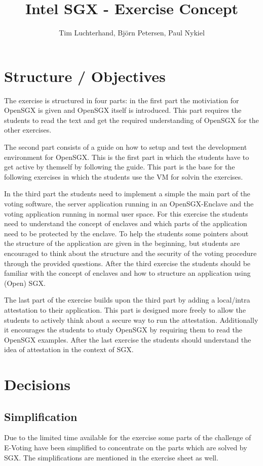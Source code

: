 \documentclass[DIN, pagenumber=false, fontsize=11pt, parskip=half]{scrartcl}
\title{Intel SGX - Exercise Concept}
\author{Tim Luchterhand, Björn Petersen, Paul Nykiel}
\begin{document}
    \maketitle
    \section{Structure / Objectives}
    The exercise is structured in four parts: in the first part the motiviation for OpenSGX is given and OpenSGX
    itself is introduced. This part requires the students to read the text and get the required understanding of
    OpenSGX for the other exercises.

    The second part consists of a guide on how to setup and test the development environment for OpenSGX. This is the
    first part in which the students have to get active by themself by following the guide. This part is the base
    for the following exercises in which the students use the VM for solvin the exercises.

    In the third part the students need to implement a simple the main part of the voting software, the server
    application running in an OpenSGX-Enclave and the voting application running in normal user space.
    For this exercise the students need to understand the concept of enclaves and which parts of the application
    need to be protected by the enclave. To help the students some pointers about the structure of the application
    are given in the beginning, but students are encouraged to think about the structure and the security of the
    voting procedure through the provided questions. After the third exercise the students should be familiar with
    the concept of enclaves and how to structure an application using (Open) SGX.

    The last part of the exercise builds upon the third part by adding a local/intra attestation to their application.
    This part is designed more freely to allow the students to actively think about a secure way to run the attestation.
    Additionally it encourages the students to study OpenSGX by requiring them to read the OpenSGX examples.
    After the last exercise the students should understand the idea of attestation in the context of SGX.
    
    \section{Decisions}
    \subsection{Simplification}
    Due to the limited time available for the exercise some parts of the challenge of
    E-Voting have been simplified to concentrate on the parts which are solved by SGX.
    The simplifications are mentioned in the exercise sheet as well.
\end{document}
